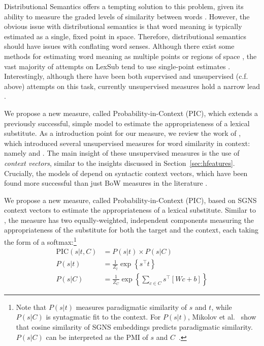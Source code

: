 \documentclass[12pt]{article}
\begin{document}
Distributional Semantics offers a tempting solution to this problem, given its
ability to measure the graded levels of similarity between words
\cite{dinu:2010:emnlp}. However, the obvious issue with distributional
semantics is that word meaning is typically estimated as a single, fixed point
in space.  Therefore, distributional semantics should have issues with
conflating word senses. Although there exist some methods for estimating word
meaning as multiple points \cite{reisinger:2010:naacl,neelakantan:2014:emnlp}
or regions of space \cite{vilnis:2015:iclr}, the vast majority of attempts on
LexSub tend to use single-point estimates
\cite{erk:2008:emnlp,dinu:2010:emnlp,thater:2010:acl,vandecruys:2011:emnlp,kremer:2014:eacl,melamud:2015:naacl,melamud:2015:vsm,kawakami:2016:iclr,roller:2016:naacl}.
Interestingly, although there have been both supervised
\cite{biemann:2012:lrec,needcite} and unsupervised (c.f. above) attempts on
this task, currently unsupervised measures hold a narrow lead
\cite{melamud:2015:naacl,melamud:2016:conll}.


We propose a new measure, called Probability-in-Context (PIC), which extends
a previously successful, simple model to estimate the appropriateness of a
lexical substitute. As a introduction point for our measure, we review the work
of , which introduced several unsupervised measures
for word similarity in context: namely \balAddCos and \addCos. The main insight
of these unsupervised measures is the use of {\em context vectors}, similar
to the insights discussed in Section~\ref{sec:hfeatures}. Crucially, the models
of  depend on syntactic context vectors, which
have been found more successful than just BoW measures in the literature
.

We propose a new measure, called Probability-in-Context (PIC), based
on SGNS context vectors to estimate the appropriateness
of a lexical substitute. Similar to \balAddCos, the measure has two equally-weighted,
independent components measuring the appropriateness of the substitute
for both the target and the context, each taking the form of a softmax:\footnote{Note that $P(s|t)$ measures paradigmatic similarity
  of $s$ and $t$, while $P(s|C)$ is syntagmatic fit to the
  context.
  For $P(s|t)$,
  Mikolov et al.~ show that cosine
  similarity of SGNS embeddings predicts
  paradigmatic similarity. $P(s|C)$ can be interpreted as the PMI of
  $s$ and $C$~\cite{levy:2014:nips}.}
\begin{equation}
  \begin{aligned}
  \mbox{PIC}(s | t, C) &= P(s | t) \times P(s | C)\\
  P(s | t) &= \frac{1}{Z_t}\exp\left\{s^\top t\right\}\\ %
  P(s | C) &= \frac{1}{Z_C}\exp\left\{\sum_{c\in C}s^\top\left[Wc + b\right]\right\}
  \end{aligned}
  \label{eqn:pic}
\end{equation}
\end{document}
